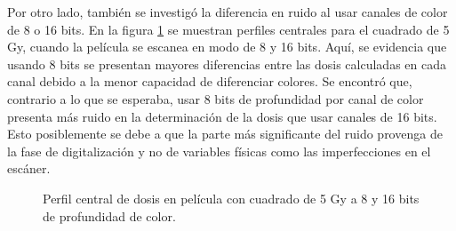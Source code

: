Por otro lado, también se investigó la diferencia en ruido al usar canales de color de 8 o 16 bits. En la figura  \ref{fig:8o16} se muestran perfiles centrales para el cuadrado de 5 Gy, cuando la película se escanea en modo de 8 y 16 bits. Aquí, se evidencia que usando 8 bits se presentan mayores diferencias entre las dosis calculadas en cada canal debido a la menor capacidad de diferenciar colores. Se encontró que, contrario a lo que se esperaba, usar 8 bits de profundidad por canal de color presenta más ruido en la determinación de la dosis que usar canales de 16 bits. Esto posiblemente se debe a que la parte más significante del ruido provenga de la fase de digitalización y no de variables físicas como las imperfecciones en el escáner. \\
\begin{figure}[H]
	\centering
	\hfill
	\caption{Perfil central de dosis en película con cuadrado de 5 Gy a 8 y 16 bits de profundidad de color.}
	\label{fig:8o16}
\end{figure}

